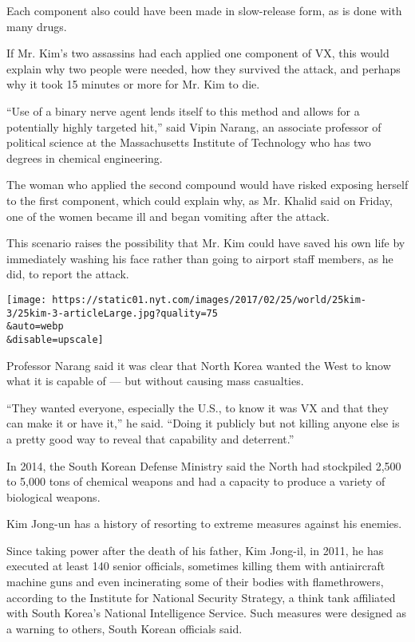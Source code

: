 Each component also could have been made in slow-release form, as is
done with many drugs.

If Mr. Kim's two assassins had each applied one component of VX, this
would explain why two people were needed, how they survived the attack,
and perhaps why it took 15 minutes or more for Mr. Kim to die.

``Use of a binary nerve agent lends itself to this method and allows for
a potentially highly targeted hit,'' said Vipin Narang, an associate
professor of political science at the Massachusetts Institute of
Technology who has two degrees in chemical engineering.

The woman who applied the second compound would have risked exposing
herself to the first component, which could explain why, as Mr. Khalid
said on Friday, one of the women became ill and began vomiting after the
attack.

This scenario raises the possibility that Mr. Kim could have saved his
own life by immediately washing his face rather than going to airport
staff members, as he did, to report the attack.

\texttt{[image: https://static01.nyt.com/images/2017/02/25/world/25kim-3/25kim-3-articleLarge.jpg?quality=75\\\&auto=webp\\\&disable=upscale]}

Professor Narang said it was clear that North Korea wanted the West to
know what it is capable of --- but without causing mass casualties.

``They wanted everyone, especially the U.S., to know it was VX and that
they can make it or have it,'' he said. ``Doing it publicly but not
killing anyone else is a pretty good way to reveal that capability and
deterrent.''

In 2014, the South Korean Defense Ministry said the North had stockpiled
2,500 to 5,000 tons of chemical weapons and had a capacity to produce a
variety of biological weapons.

Kim Jong-un has a history of resorting to extreme measures against his
enemies.

Since taking power after the death of his father, Kim Jong-il, in 2011,
he has executed at least 140 senior officials, sometimes killing them
with antiaircraft machine guns and even incinerating some of their
bodies with flamethrowers, according to the Institute for National
Security Strategy, a think tank affiliated with South Korea's National
Intelligence Service. Such measures were designed as a warning to
others, South Korean officials said.

